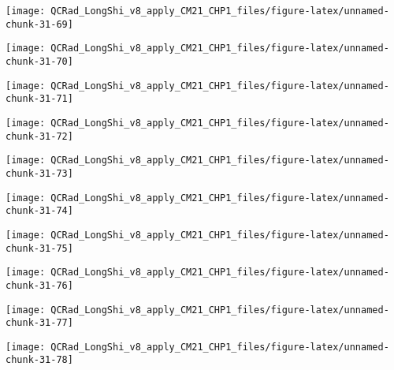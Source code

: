 \documentclass[
  10pt,
  a4paper,oneside]{article}
\begin{document}
\begin{center}\texttt{[image: QCRad\_LongShi\_v8\_apply\_CM21\_CHP1\_files/figure-latex/unnamed-chunk-31-69]} \end{center}

\begin{center}\texttt{[image: QCRad\_LongShi\_v8\_apply\_CM21\_CHP1\_files/figure-latex/unnamed-chunk-31-70]} \end{center}

\begin{center}\texttt{[image: QCRad\_LongShi\_v8\_apply\_CM21\_CHP1\_files/figure-latex/unnamed-chunk-31-71]} \end{center}

\begin{center}\texttt{[image: QCRad\_LongShi\_v8\_apply\_CM21\_CHP1\_files/figure-latex/unnamed-chunk-31-72]} \end{center}

\begin{center}\texttt{[image: QCRad\_LongShi\_v8\_apply\_CM21\_CHP1\_files/figure-latex/unnamed-chunk-31-73]} \end{center}

\begin{center}\texttt{[image: QCRad\_LongShi\_v8\_apply\_CM21\_CHP1\_files/figure-latex/unnamed-chunk-31-74]} \end{center}

\begin{center}\texttt{[image: QCRad\_LongShi\_v8\_apply\_CM21\_CHP1\_files/figure-latex/unnamed-chunk-31-75]} \end{center}

\begin{center}\texttt{[image: QCRad\_LongShi\_v8\_apply\_CM21\_CHP1\_files/figure-latex/unnamed-chunk-31-76]} \end{center}

\begin{center}\texttt{[image: QCRad\_LongShi\_v8\_apply\_CM21\_CHP1\_files/figure-latex/unnamed-chunk-31-77]} \end{center}

\begin{center}\texttt{[image: QCRad\_LongShi\_v8\_apply\_CM21\_CHP1\_files/figure-latex/unnamed-chunk-31-78]} \end{center}
\end{document}
